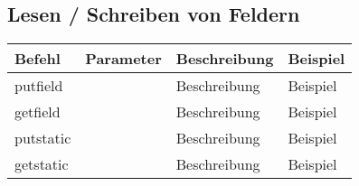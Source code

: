 \subsection{Lesen / Schreiben von Feldern}
\begin{table}[H]
	\centering
	\label{my-label}
	\begin{tabular}{l|l|l|l}
		Befehl & Parameter & Beschreibung & Beispiel \\ \hline
		
		putfield & \open & Beschreibung & Beispiel \\ \hline	
		
		getfield & \open & Beschreibung & Beispiel \\ \hline	
		
		putstatic & \open & Beschreibung & Beispiel \\ \hline	
		
		getstatic & \open & Beschreibung & Beispiel \\ \hline	
		
	\end{tabular}
\end{table}


